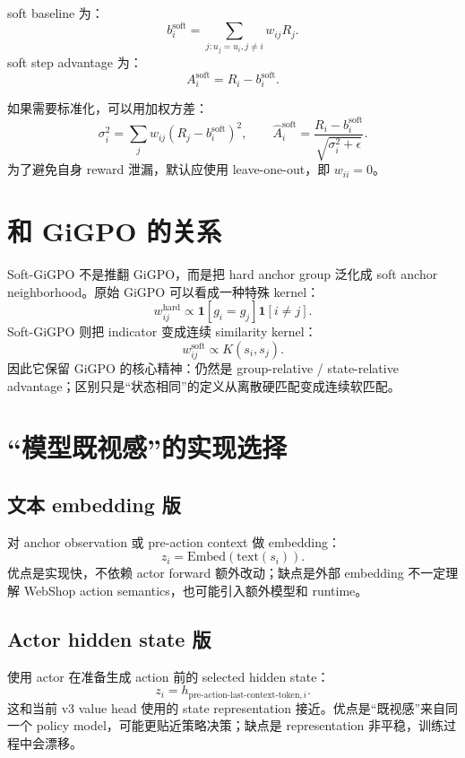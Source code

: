 \documentclass[10pt]{ctexart}
\begin{document}
soft baseline 为：
\begin{equation}
  b_i^{\mathrm{soft}}=\sum_{j:u_j=u_i,j\ne i} w_{ij}R_j.
\end{equation}
soft step advantage 为：
\begin{equation}
  A_i^{\mathrm{soft}}=R_i-b_i^{\mathrm{soft}}.
\end{equation}

如果需要标准化，可以用加权方差：
\begin{equation}
  \sigma_i^2=\sum_j w_{ij}(R_j-b_i^{\mathrm{soft}})^2,
  \qquad
  \hat A_i^{\mathrm{soft}}=\frac{R_i-b_i^{\mathrm{soft}}}{\sqrt{\sigma_i^2+\epsilon}}.
\end{equation}
为了避免自身 reward 泄漏，默认应使用 leave-one-out，即 $w_{ii}=0$。

\section{和 GiGPO 的关系}
Soft-GiGPO 不是推翻 GiGPO，而是把 hard anchor group 泛化成 soft anchor neighborhood。原始 GiGPO 可以看成一种特殊 kernel：
\begin{equation}
  w_{ij}^{\mathrm{hard}}\propto \mathbf{1}[g_i=g_j]\mathbf{1}[i\ne j].
\end{equation}
Soft-GiGPO 则把 indicator 变成连续 similarity kernel：
\begin{equation}
  w_{ij}^{\mathrm{soft}}\propto K(s_i,s_j).
\end{equation}
因此它保留 GiGPO 的核心精神：仍然是 group-relative / state-relative advantage；区别只是“状态相同”的定义从离散硬匹配变成连续软匹配。

\section{“模型既视感”的实现选择}
\subsection{文本 embedding 版}
对 anchor observation 或 pre-action context 做 embedding：
\begin{equation}
  z_i=\mathrm{Embed}(\mathrm{text}(s_i)).
\end{equation}
优点是实现快，不依赖 actor forward 额外改动；缺点是外部 embedding 不一定理解 WebShop action semantics，也可能引入额外模型和 runtime。

\subsection{Actor hidden state 版}
使用 actor 在准备生成 action 前的 selected hidden state：
\begin{equation}
  z_i=h_{\mathrm{pre\text{-}action\text{-}last\text{-}context\text{-}token},i}.
\end{equation}
这和当前 v3 value head 使用的 state representation 接近。优点是“既视感”来自同一个 policy model，可能更贴近策略决策；缺点是 representation 非平稳，训练过程中会漂移。
\end{document}
